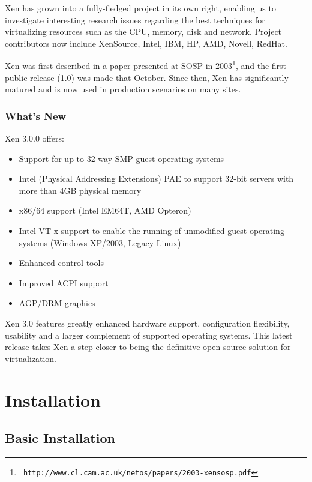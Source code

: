 \documentclass[11pt,twoside,final,openright]{report}
\begin{document}
Xen has grown into a fully-fledged project in its own right, enabling us
to investigate interesting research issues regarding the best techniques
for virtualizing resources such as the CPU, memory, disk and network.
Project contributors now include XenSource, Intel, IBM, HP, AMD, Novell,
RedHat.

Xen was first described in a paper presented at SOSP in
2003\footnote{\tt
  http://www.cl.cam.ac.uk/netos/papers/2003-xensosp.pdf}, and the first
public release (1.0) was made that October. Since then, Xen has
significantly matured and is now used in production scenarios on many
sites.

\section{What's New}

Xen 3.0.0 offers:

\begin{itemize}
\item Support for up to 32-way SMP guest operating systems
\item Intel (Physical Addressing Extensions) PAE to support 32-bit
  servers with more than 4GB physical memory
\item x86/64 support (Intel EM64T, AMD Opteron)
\item Intel VT-x support to enable the running of unmodified guest
operating systems (Windows XP/2003, Legacy Linux)
\item Enhanced control tools
\item Improved ACPI support
\item AGP/DRM graphics
\end{itemize}


Xen 3.0 features greatly enhanced hardware support, configuration
flexibility, usability and a larger complement of supported operating
systems.  This latest release takes Xen a step closer to being the 
definitive open source solution for virtualization.



\part{Installation}

\chapter{Basic Installation}
\end{document}
